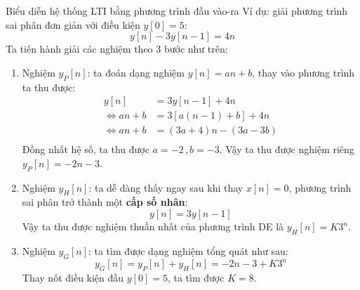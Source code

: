 \documentclass[8pt]{beamer}
\begin{document}
\begin{frame}{Biểu diễn hệ thống LTI bằng phương trình đầu vào-ra}
Ví dụ: giải phương trình sai phân đơn giản với điều kiện $y[0]=5$:
$$y[n]-3y[n-1]=4n$$
Ta tiến hành giải các nghiệm theo 3 bước như trên:
\begin{enumerate}
	\item Nghiệm $y_{P}[n]$: ta đoán dạng nghiệm $y[n]=an+b$, thay vào phương trình ta thu được: 
	\begin{equation*}
	\begin{split}
		y[n]&=3y[n-1]+4n\\
		\Leftrightarrow an+b&=3[a(n-1)+b]+4n \\
		\Leftrightarrow an+b&=(3a+4)n-(3a-3b)\\
	\end{split}
	\end{equation*}
	Đồng nhất hệ số, ta thu được $a=-2\, , b=-3$. Vậy ta thu được nghiệm riêng $y_{P}[n]=-2n-3$.
\item Nghiệm $y_{H}[n]$: ta dễ dàng thấy ngay sau khi thay \alert{$x[n]=0$}, phương trình sai phân trở thành một \textbf{cấp số nhân}: $$y[n]=3y[n-1]$$
	Vậy ta thu được nghiệm thuần nhất của phương trình DE là $y_{H}[n]=K3^{n}$.
\item Nghiệm $y_{G}[n]$: ta tìm được dạng nghiệm tổng quát như sau: $$y_{G}[n]=y_{P}[n]+y_{H}[n]=-2n-3+K3^n$$
Thay nốt điều kiện đầu $y[0]=5$, ta tìm được $K=8$.
\end{enumerate}
\end{frame}
\end{document}

